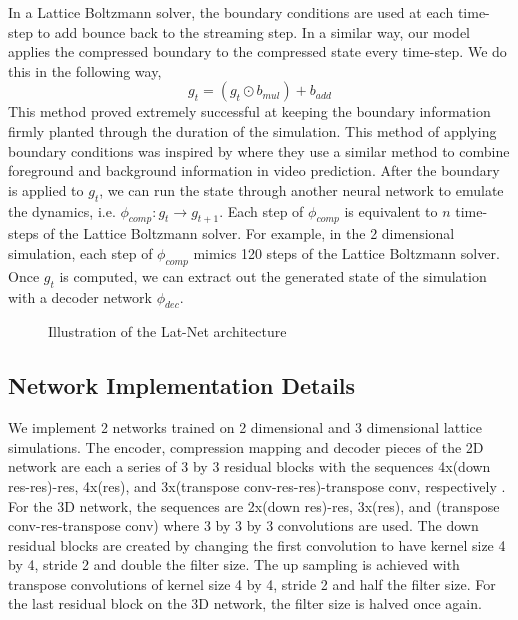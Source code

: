 \documentclass{article}
\begin{document}
In a Lattice Boltzmann solver, the boundary conditions are used at each time-step to add bounce back to the streaming step. In a similar way, our model applies the compressed boundary to the compressed state every time-step. We do this in the following way,
\begin{equation}
  g_t = (g_t \odot b_{mul}) + b_{add}
\end{equation}
This method proved extremely successful at keeping the boundary information firmly planted through the duration of the simulation. This method of applying boundary conditions was inspired by \cite{vondrick2016generating} where they use a similar method to combine foreground and background information in video prediction. After the boundary is applied to $g_t$, we can run the state through another neural network to emulate the dynamics, i.e. $\phi_{comp}:g_{t} \rightarrow g_{t+1}$. Each step of $\phi_{comp}$ is equivalent to $n$ time-steps of the Lattice Boltzmann solver. For example, in the 2 dimensional simulation, each step of $\phi_{comp}$ mimics 120 steps of the Lattice Boltzmann solver. Once $g_t$ is computed, we can extract out the generated state of the simulation with a decoder network $\phi_{dec}$. 

\begin{figure}[!t]
\centering
{}
\caption{Illustration of the Lat-Net architecture}
\label{fig_1}
\end{figure}

\subsection{Network Implementation Details}

We implement 2 networks trained on 2 dimensional and 3 dimensional lattice simulations. The encoder, compression mapping and decoder pieces of the 2D network are each a series of 3 by 3 residual blocks with the sequences 4x(down res-res)-res, 4x(res), and 3x(transpose conv-res-res)-transpose conv, respectively \cite{he2016deep}. For the 3D network, the sequences are 2x(down res)-res, 3x(res), and (transpose conv-res-transpose conv) where 3 by 3 by 3 convolutions are used. The down residual blocks are created by changing the first convolution to have kernel size 4 by 4, stride 2 and double the filter size. The up sampling is achieved with transpose convolutions of kernel size 4 by 4, stride 2 and half the filter size. For the last residual block on the 3D network, the filter size is halved once again.
\end{document}
